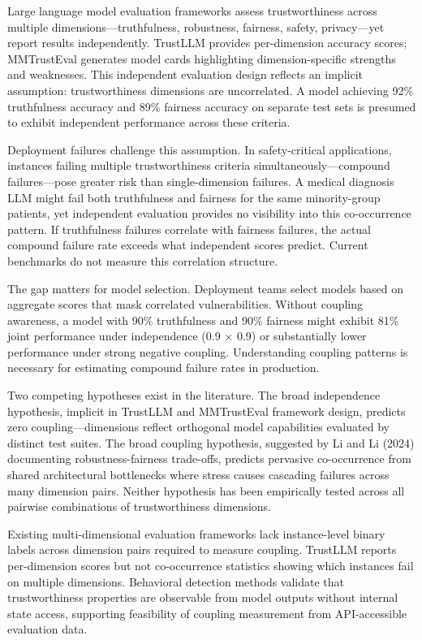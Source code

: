 
Large language model evaluation frameworks assess trustworthiness across multiple dimensions---truthfulness, robustness, fairness, safety, privacy---yet report results independently. TrustLLM provides per-dimension accuracy scores; MMTrustEval generates model cards highlighting dimension-specific strengths and weaknesses. This independent evaluation design reflects an implicit assumption: trustworthiness dimensions are uncorrelated. A model achieving 92\% truthfulness accuracy and 89\% fairness accuracy on separate test sets is presumed to exhibit independent performance across these criteria.

Deployment failures challenge this assumption. In safety-critical applications, instances failing multiple trustworthiness criteria simultaneously---compound failures---pose greater risk than single-dimension failures. A medical diagnosis LLM might fail both truthfulness and fairness for the same minority-group patients, yet independent evaluation provides no visibility into this co-occurrence pattern. If truthfulness failures correlate with fairness failures, the actual compound failure rate exceeds what independent scores predict. Current benchmarks do not measure this correlation structure.

The gap matters for model selection. Deployment teams select models based on aggregate scores that mask correlated vulnerabilities. Without coupling awareness, a model with 90\% truthfulness and 90\% fairness might exhibit 81\% joint performance under independence (0.9 $\times$ 0.9) or substantially lower performance under strong negative coupling. Understanding coupling patterns is necessary for estimating compound failure rates in production.

Two competing hypotheses exist in the literature. The broad independence hypothesis, implicit in TrustLLM and MMTrustEval framework design, predicts zero coupling---dimensions reflect orthogonal model capabilities evaluated by distinct test suites. The broad coupling hypothesis, suggested by Li and Li (2024) documenting robustness-fairness trade-offs, predicts pervasive co-occurrence from shared architectural bottlenecks where stress causes cascading failures across many dimension pairs. Neither hypothesis has been empirically tested across all pairwise combinations of trustworthiness dimensions.

Existing multi-dimensional evaluation frameworks lack instance-level binary labels across dimension pairs required to measure coupling. TrustLLM reports per-dimension scores but not co-occurrence statistics showing which instances fail on multiple dimensions. Behavioral detection methods \citep{Zheng2024} validate that trustworthiness properties are observable from model outputs without internal state access, supporting feasibility of coupling measurement from API-accessible evaluation data.

